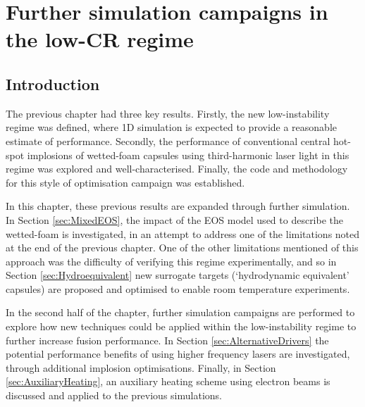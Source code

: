 

\chapter{\label{ch-FurtherSims} Further simulation campaigns in the low-CR regime}

\minitoc

\section{Introduction}
The previous chapter had three key results. Firstly, the new low-instability regime was defined, where 1D simulation is expected to provide a reasonable estimate of performance. Secondly, the performance of conventional central hot-spot implosions of wetted-foam capsules using third-harmonic laser light in this regime was explored and well-characterised. Finally, the code and methodology for this style of optimisation campaign was established.

In this chapter, these previous results are expanded through further simulation.  In Section \ref{sec:MixedEOS}, the impact of the EOS model used to describe the wetted-foam is investigated, in an attempt to address one of the limitations noted at the end of the previous chapter. One of the other limitations mentioned of this approach was the difficulty of verifying this regime experimentally, and so in Section \ref{sec:Hydroequivalent} new surrogate targets (`hydrodynamic equivalent' capsules) are proposed and optimised to enable room temperature experiments.

In the second half of the chapter, further simulation campaigns are performed to explore how new techniques could be applied within the low-instability regime to further increase fusion performance. In Section \ref{sec:AlternativeDrivers} the potential performance benefits of using higher frequency lasers are investigated, through additional implosion optimisations. Finally, in Section \ref{sec:AuxiliaryHeating}, an auxiliary heating scheme using electron beams is discussed and applied to the previous simulations.

